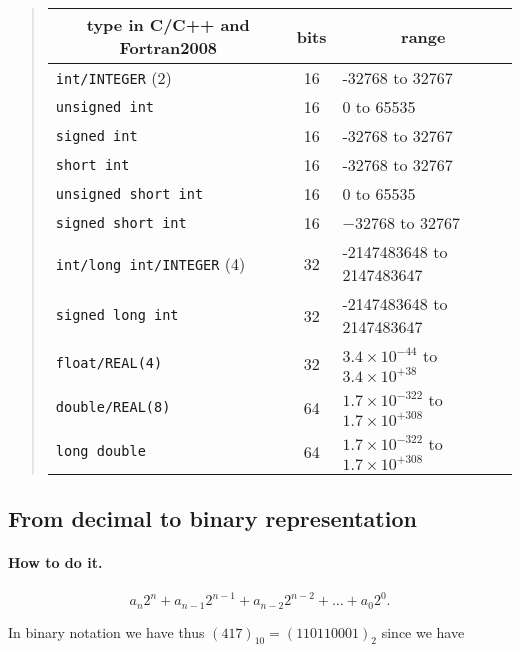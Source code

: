 \documentclass[%
oneside,                 %
final,                   %
10pt]{article}
\begin{document}
{\begin{quote}
\begin{tabular}{lcl}
\hline
\multicolumn{1}{c}{ type in C/C++ and Fortran2008 } & \multicolumn{1}{c}{ bits } & \multicolumn{1}{c}{ range } \\
\hline
\Verb!int/INTEGER! (2)          & 16   & -32768 to 32767                                \\
\Verb!unsigned int!             & 16   & 0 to 65535                                     \\
\Verb!signed int!               & 16   & -32768 to 32767                                \\
\Verb!short int!                & 16   & -32768 to 32767                                \\
\Verb!unsigned short int!       & 16   & 0 to 65535                                     \\
\Verb!signed short int!         & 16   & $-32768$ to 32767                              \\
\Verb!int/long int/INTEGER! (4) & 32   & -2147483648 to 2147483647                      \\
\Verb!signed long int!          & 32   & -2147483648 to 2147483647                      \\
\Verb!float/REAL(4)!            & 32   & $3.4\times 10^{-44}$ to $3.4\times 10^{+38}$   \\
\Verb!double/REAL(8)!           & 64   & $1.7\times 10^{-322}$ to $1.7\times 10^{+308}$ \\
\Verb!long double!              & 64   & $1.7\times 10^{-322}$ to $1.7\times 10^{+308}$ \\
\hline
\end{tabular}
\end{quote}

\noindent




\subsection{From decimal to binary representation}


\paragraph{How to do it.}
\[
  a_n2^n+a_{n-1}2^{n-1}  +a_{n-2}2^{n-2}  +\dots +a_{0}2^{0}.
\]

In binary notation we have thus $(417)_{10} =(110110001)_2$
since we have

}
\end{document}
